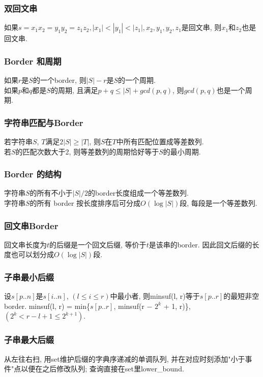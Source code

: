 \subsubsection*{双回文串}
\noindent
如果$s=x_1x_2=y_1y_2=z_1z_2, |x_1|<|y_1|<|z_1|, x_2, y_1, y_2, z_1$是回文串, 则$x_1$和$z_2$也是回文串. 

\subsubsection*{Border 和周期}
\noindent
如果$r$是$S$的一个border, 则$|S|-r$是$S$的一个周期.\\
如果$p$和$q$都是$S$的周期, 且满足$p+q\le |S|+gcd(p,q)$, 则$gcd(p,q)$也是一个周期.

\subsubsection*{字符串匹配与Border}
\noindent
若字符串$S$, $T$满足$2|S|\ge |T|$, 则$S$在$T$中所有匹配位置成等差数列.\\
若$S$的匹配次数大于2, 则等差数列的周期恰好等于$S$的最小周期.

\subsubsection*{Border 的结构}
\noindent
字符串$S$的所有不小于$|S|/2$的border长度组成一个等差数列.\\
字符串$S$的所有 border 按长度排序后可分成$O(\log{|S|})$段, 每段是一个等差数列. 

\subsubsection*{回文串Border}
\noindent
回文串长度为$t$的后缀是一个回文后缀, 等价于$t$是该串的border. 因此回文后缀的长度也可以划分成$O(\log{|S|})$段.

\subsubsection*{子串最小后缀}
\noindent
设$s[p..n]$是$s[i..n]$, $(l \leq i \leq r)$中最小者, 则minsuf(l, r)等于$s[p..r]$的最短非空 border. minsuf(l, r) = min\{$s[p..r]$, minsuf(r − $2^k$ + 1, r)\}, $(2^k < r − l + 1 \leq 2^{k+1})$. 

\subsubsection*{子串最大后缀}
\noindent
从左往右扫, 用set维护后缀的字典序递减的单调队列, 并在对应时刻添加"小于事件"点以便在之后修改队列; 查询直接在set里lower\_bound. 

